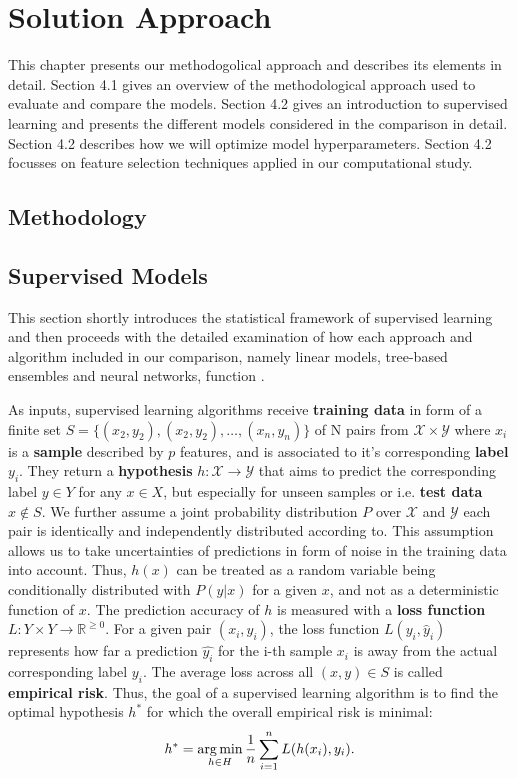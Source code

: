 

\chapter{Solution Approach}
This chapter presents our methodogolical approach and describes its elements in detail.
Section 4.1 gives an overview of the methodological approach used to evaluate and compare the models. 
Section 4.2 gives an introduction to supervised learning and presents the different models considered in the comparison in detail.
Section 4.2 describes how we will optimize model hyperparameters. 
Section 4.2 focusses on feature selection techniques applied in our computational study.

\section{Methodology}


\section{Supervised Models}

This section shortly introduces the statistical framework of supervised learning \citep{SLFoundations} and then proceeds with the detailed examination of how each approach and algorithm included in our comparison, namely linear models, tree-based ensembles and neural networks, function \citep{friedman2001elements}.

As inputs, supervised learning algorithms receive \textbf{training data} in form of a finite set $ S = \{({x}_{2}, y_2), ({x}_{2}, y_2), \dots, ({x}_{n}, y_n)\}$ of N pairs from $ \mathcal{X} \times \mathcal{Y} $ where $ x_i $ is a \textbf{sample} described by $ p $ features, and is associated to it's corresponding \textbf{label} $ y_i $.
They return a \textbf{hypothesis} $ h: \mathcal{X} \to \mathcal{Y} $ that aims to predict the corresponding label $ y \in Y $ for any $ x \in X $, but especially for unseen samples or i.e. \textbf{test data} $ x \notin S $.
We further assume a joint probability distribution $ P $ over $ \mathcal{X} $ and $ \mathcal{Y} $ each pair is identically and independently distributed according to. 
This assumption allows us to take uncertainties of predictions in form of noise in the training data into account. 
Thus, $ h(x) $ can be treated as a random variable being conditionally distributed with $ P(y | x) $ for a given $ x $, and not as a deterministic function of $ x $.
The prediction accuracy of $ h $ is measured with a  \textbf{loss function} $ L : Y \times Y \to \mathbb{R}^{\geq 0}$.
For a given pair $ ({x}_i, y_i) $, the loss function $ L(y_i, \hat{y}_i) $ represents how far a prediction $ \hat{y_i} $ for the i-th sample $ x_i $ is away from the actual corresponding label $ y_i $. 
The average loss across all $ (x,y) \in S $ is called \textbf{empirical risk}.
Thus, the goal of a supervised learning algorithm is to find the optimal hypothesis $ h^* $ for which the overall empirical risk is minimal: 
\begin{equation}
	h^* = \operatorname*{arg\,min}_{h \in H} \dfrac{1}{n} \sum_{i=1}^{n} L(h(x_i), y_i).
\end{equation}

